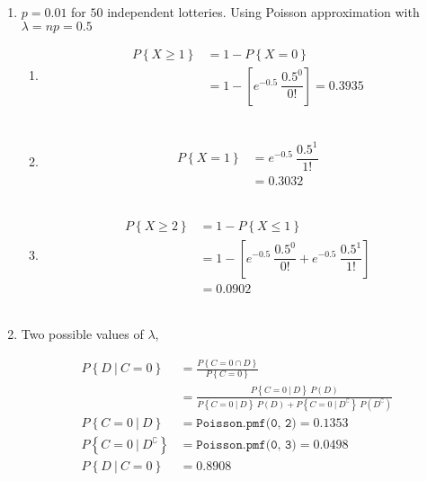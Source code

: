\begin{enumerate}
	\item $ p = 0.01 $ for $ 50 $ independent lotteries. Using Poisson approximation with $ \lambda = np = 0.5 $\\
	
		\begin{enumerate}
			\item 
			\begin{align}
				P \left\{X \geq 1\right\} &= 1 - P \left\{X = 0\right\} \nonumber \\
				&= 1 - \left[e^{-0.5} \ \dfrac{0.5^0}{0!}\right] = 0.3935
			\end{align}\\
			
			\item 
			\begin{align}
				P \left\{X = 1\right\} &= e^{-0.5} \ \dfrac{0.5^1}{1!} \nonumber \\
				&= 0.3032
			\end{align}\\
			
			\item 
			\begin{align}
				P \left\{X \geq 2\right\} &= 1 - P \left\{X \leq 1\right\} \nonumber \\
				&= 1 - \left[e^{-0.5} \ \dfrac{0.5^0}{0!} + e^{-0.5} \ \dfrac{0.5^1}{1!}\right] \nonumber \\
				&= 0.0902
			\end{align}\\
			
		\end{enumerate}
	 
	
	\item Two possible values of $ \lambda $, 
	
		\begin{align}
			P \left\{D\ |\ C = 0 \right\} &= \frac{P\left\{C = 0 \cap D\right\}}{P\left\{C = 0\right\}} \\
			&= \frac{P \left\{C = 0\ |\ D \right\}\ P(D)}{P \left\{C = 0\ |\ D \right\}\ P(D) + P \left\{C = 0\ |\ D^\complement \right\}\ P(D^\complement)} \nonumber \\
			P \left\{C = 0\ |\ D \right\} &= \texttt{Poisson.pmf(0, 2)} = 0.1353 \nonumber \\
			P \left\{C = 0\ |\ D^\complement \right\} &= \texttt{Poisson.pmf(0, 3)} = 0.0498 \nonumber \\
			P \left\{D\ |\ C = 0 \right\} &= 0.8908
		\end{align}\\
	 

\end{enumerate}
